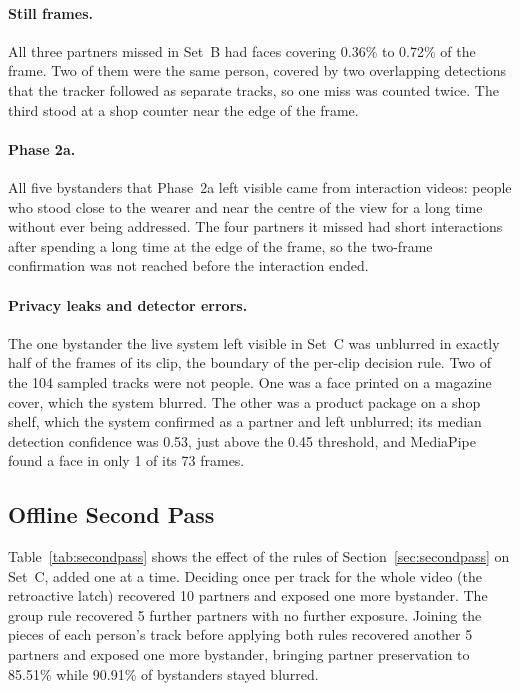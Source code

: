 \paragraph{Still frames.}
All three partners missed in Set~B had faces covering 0.36\% to 0.72\% of the frame. Two of
them were the same person, covered by two overlapping detections that the tracker followed
as separate tracks, so one miss was counted twice. The third stood at a shop counter near
the edge of the frame.

\paragraph{Phase 2a.}
All five bystanders that Phase~2a left visible came from interaction videos: people who
stood close to the wearer and near the centre of the view for a long time without ever
being addressed. The four partners it missed had short interactions after spending a long
time at the edge of the frame, so the two-frame confirmation was not reached before the
interaction ended.

\paragraph{Privacy leaks and detector errors.}
The one bystander the live system left visible in Set~C was unblurred in exactly half of
the frames of its clip, the boundary of the per-clip decision rule. Two of the 104 sampled
tracks were not people. One was a face printed on a magazine cover, which the system
blurred. The other was a product package on a shop shelf, which the system confirmed as a
partner and left unblurred; its median detection confidence was 0.53, just above the 0.45
threshold, and MediaPipe found a face in only 1 of its 73 frames.

\subsection{Offline Second Pass}
\label{sec:res_secondpass}

Table~\ref{tab:secondpass} shows the effect of the rules of Section~\ref{sec:secondpass}
on Set~C, added one at a time. Deciding once per track for the whole video (the
retroactive latch) recovered 10 partners and exposed one more bystander. The group rule
recovered 5 further partners with no further exposure. Joining the pieces of each person's
track before applying both rules recovered another 5 partners and exposed one more
bystander, bringing partner preservation to 85.51\% while 90.91\% of bystanders stayed
blurred.

